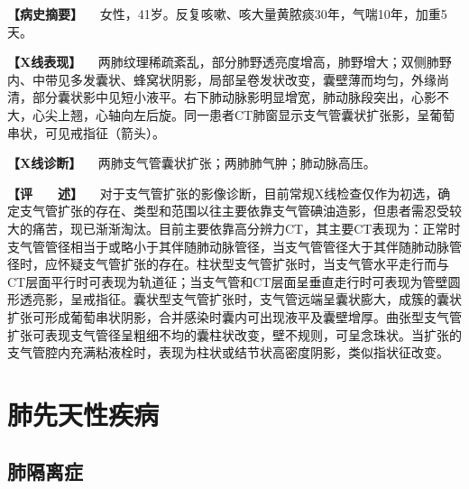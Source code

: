 \textbf{【病史摘要】}
　女性，41岁。反复咳嗽、咳大量黄脓痰30年，气喘10年，加重5天。

\textbf{【X线表现】}
　两肺纹理稀疏紊乱，部分肺野透亮度增高，肺野增大；双侧肺野内、中带见多发囊状、蜂窝状阴影，局部呈卷发状改变，囊壁薄而均匀，外缘尚清，部分囊状影中见短小液平。右下肺动脉影明显增宽，肺动脉段突出，心影不大，心尖上翘，心轴向左后旋。同一患者CT肺窗显示支气管囊状扩张影，呈葡萄串状，可见戒指征（箭头）。

\textbf{【X线诊断】} 　两肺支气管囊状扩张；两肺肺气肿；肺动脉高压。

\textbf{【评　　述】}
　对于支气管扩张的影像诊断，目前常规X线检查仅作为初选，确定支气管扩张的存在、类型和范围以往主要依靠支气管碘油造影，但患者需忍受较大的痛苦，现已渐渐淘汰。目前主要依靠高分辨力CT，其主要CT表现为：正常时支气管管径相当于或略小于其伴随肺动脉管径，当支气管管径大于其伴随肺动脉管径时，应怀疑支气管扩张的存在。柱状型支气管扩张时，当支气管水平走行而与CT层面平行时可表现为轨道征；当支气管和CT层面呈垂直走行时可表现为管壁圆形透亮影，呈戒指征。囊状型支气管扩张时，支气管远端呈囊状膨大，成簇的囊状扩张可形成葡萄串状阴影，合并感染时囊内可出现液平及囊壁增厚。曲张型支气管扩张可表现支气管径呈粗细不均的囊柱状改变，壁不规则，可呈念珠状。当扩张的支气管腔内充满粘液栓时，表现为柱状或结节状高密度阴影，类似指状征改变。

\section{肺先天性疾病}

\subsection{肺隔离症}


